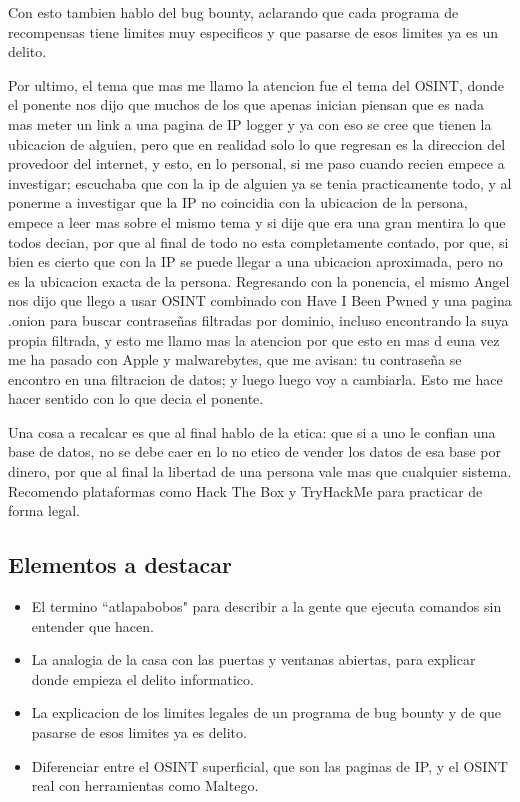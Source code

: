 \documentclass[letterpaper,12pt]{article}
\begin{document}
Con esto tambien hablo del bug bounty, aclarando que
cada programa de recompensas tiene limites muy especificos 
y que pasarse de esos limites ya es un delito.

Por ultimo, el tema que mas me llamo la atencion fue el tema del 
OSINT, donde el ponente nos dijo 
que muchos de los que apenas inician 
piensan que es nada mas meter un link a una pagina de IP logger
y ya con eso se cree que tienen la ubicacion de alguien, 
pero que en realidad solo lo que regresan es la 
direccion del provedoor del internet, y esto, 
en lo personal, si me paso cuando recien empece a investigar; 
escuchaba que con la ip de alguien ya se tenia practicamente todo, 
y al ponerme a investigar que la IP no coincidia con la ubicacion 
de la persona, empece a leer mas sobre el mismo tema y si dije 
que era una gran mentira lo que todos decian, por que al final 
de todo no esta completamente contado, por que, 
si bien es cierto que con la IP se puede llegar a una ubicacion aproximada,
pero no es la ubicacion exacta de la persona. Regresando 
con la ponencia, el mismo Angel nos dijo que llego a usar 
OSINT combinado con  Have I Been Pwned y una pagina
.onion para buscar contraseñas filtradas por dominio, incluso encontrando la
suya propia filtrada, y esto me llamo mas la atencion 
por que esto en mas d euna vez me ha pasado con Apple y malwarebytes, que me avisan: 
tu contraseña se encontro en una filtracion de datos; 
y luego luego voy a cambiarla. Esto me hace hacer sentido con lo que decia 
el ponente.

Una cosa a recalcar es que al final hablo de la etica: que si a uno le confian una base de datos, 
no se debe caer en lo no etico de vender los datos de esa base por dinero, 
por que al final la libertad de una persona vale mas que
cualquier sistema. Recomendo plataformas como Hack The Box y TryHackMe
para practicar de forma legal.

\subsection{Elementos a destacar}

\begin{itemize}
  \item El termino ``atlapabobos" para describir a la gente que ejecuta comandos sin entender
  que hacen.
  \item La analogia de la casa con las puertas y ventanas abiertas, para explicar donde empieza el
  delito informatico.
  \item La explicacion de los limites legales de un programa de bug bounty y de que pasarse de
  esos limites ya es delito.
  \item Diferenciar entre el OSINT superficial, que son las paginas de IP,
  y el OSINT real con herramientas como Maltego.
\end{itemize}
\end{document}

